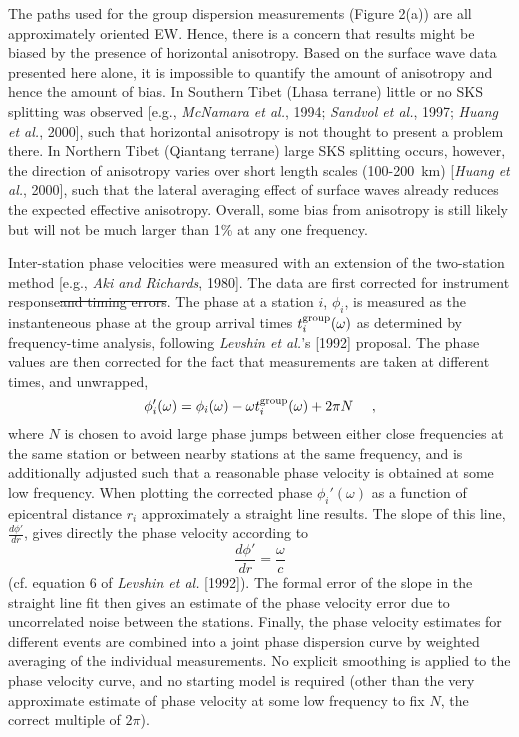 \documentclass[12pt]{article}
\renewcommand{\remove}[1]{} %
\providecommand{\DIFadd}[1]{{\protect\color{blue}\uwave{#1}}} %
\providecommand{\DIFdel}[1]{{\protect\color{red}\sout{#1}}}                      %
\providecommand{\DIFaddbegin}{} %
\providecommand{\DIFaddend}{} %
\providecommand{\DIFdelbegin}{} %
\providecommand{\DIFdelend}{} %
\begin{document}
The paths used for the group dispersion measurements (Figure 2(a)) are all
  approximately oriented EW. Hence, there is a concern that results might be
  biased by the presence of horizontal anisotropy.  Based on the surface wave
  data presented here alone, it is impossible to quantify the amount of
  anisotropy and hence the amount of bias.  In Southern Tibet (Lhasa terrane)
little or no  SKS splitting was observed [e.g., {\it McNamara et
    al.}, 1994; {\it Sandvol et    al.}, 1997; {\it Huang et    al.}, 2000],
  such that horizontal anisotropy is not thought to present a problem there.  In
  Northern Tibet (Qiantang terrane) large SKS splitting occurs, however, the direction of
  anisotropy varies over short length scales (100-200~km) [{\it Huang et
    al.}, 2000], such that the lateral averaging effect of surface waves already
  reduces the expected effective anisotropy.  Overall, some bias from anisotropy
  is still likely but will not be much larger than 1\% \DIFaddbegin \DIFadd{(of the
phase or group
velocity, i.e., $\sim$0.03 km/s) }\DIFaddend at any one frequency.

Inter-station phase velocities were measured with an extension of the two-station method [e.g., {\it Aki 
and Richards}, 1980]. The data are first corrected for instrument response\DIFdelbegin \DIFdel{and timing errors}\DIFdelend \DIFaddbegin \DIFadd{\remove{ and timing errors}}\DIFaddend . The phase at 
a station $i$, $\phi_i$, is measured as the instanteneous phase at the group arrival times $t^{\rm 
group}_i(\omega)$ as determined by frequency-time analysis, following {\it Levshin et al.}'s [1992] 
proposal.  The phase values are then corrected for the fact that measurements are taken at different times, 
and unwrapped,
 \begin{displaymath} 
\phi_i'(\omega)=\phi_i(\omega)-\omega t^{\rm group}_i(\omega)+2\pi N \ \ \ \ ,
\end{displaymath} 
where $N$ is chosen to avoid large phase jumps between either close frequencies at 
the same station or between nearby stations at the same frequency, and
is additionally adjusted such that a
reasonable phase velocity is obtained at some low frequency.  When plotting the corrected phase 
$\phi_i'(\omega)$ as a function of epicentral distance $r_i$ approximately a straight line results.  The 
slope of this line, $\frac{d\phi'}{dr}$, gives directly the phase velocity according to \begin{displaymath} 
\frac{d\phi'}{dr}=\frac{\omega}{c} \end{displaymath} (cf. equation 6 of {\it Levshin et al.} [1992]). The 
formal error of the slope in the straight line fit then gives an estimate of the phase velocity error due 
to uncorrelated noise between the stations.  Finally, the phase velocity estimates for different events are 
combined into a joint phase dispersion curve by weighted averaging of the individual measurements.  No 
explicit smoothing is applied to the phase velocity curve, and no starting model is required (other than 
the very approximate estimate of phase velocity at some low frequency to fix $N$, the correct multiple of 
$2\pi$). 
\end{document}
